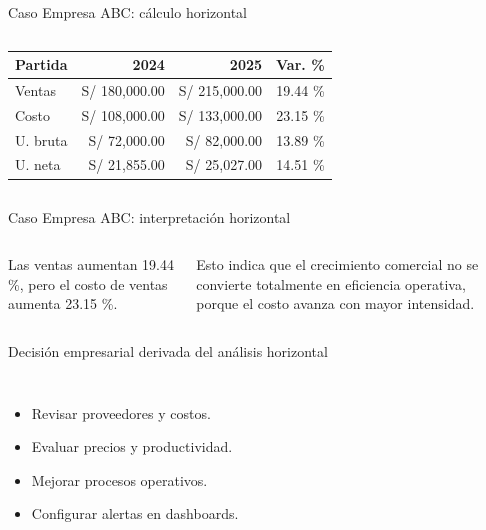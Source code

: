 \begin{frame}{Caso Empresa ABC: cálculo horizontal}
  \begin{columns}[T,onlytextwidth]
    \scriptsize
    \begin{tabular}{lrrr}
      \toprule
      Partida & 2024 & 2025 & Var. \% \\
      \midrule
      Ventas & S/ 180,000.00 & S/ 215,000.00 & 19.44 \% \\
      Costo & S/ 108,000.00 & S/ 133,000.00 & 23.15 \% \\
      U. bruta & S/ 72,000.00 & S/ 82,000.00 & 13.89 \% \\
      U. neta & S/ 21,855.00 & S/ 25,027.00 & 14.51 \% \\
      \bottomrule
    \end{tabular}
  \end{columns}
\end{frame}

\begin{frame}{Caso Empresa ABC: interpretación horizontal}
  \begin{columns}[T,onlytextwidth]
    \footnotesize
    Las ventas aumentan 19.44 \%, pero el costo de ventas aumenta 23.15 \%.

    \vspace{0.5em}
    Esto indica que el crecimiento comercial no se convierte totalmente en eficiencia operativa, porque el costo avanza con mayor intensidad.
  \end{columns}
\end{frame}

\begin{frame}{Decisión empresarial derivada del análisis horizontal}
  \begin{columns}[T,onlytextwidth]
    \begin{itemize}
      \item Revisar proveedores y costos.
      \item Evaluar precios y productividad.
      \item Mejorar procesos operativos.
      \item Configurar alertas en dashboards.
    \end{itemize}
  \end{columns}
\end{frame}
